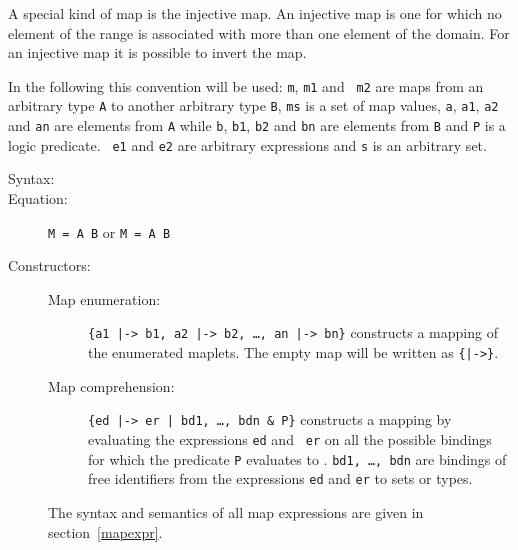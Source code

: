 \documentclass[\pformat,12pt]{article}
\begin{document}
A special kind of map is the injective map. An injective map is one
for which no element of the range is associated with more than one
element of the domain. For an injective map it is possible to invert
the map.

In the following this convention will be used: {\tt m}, {\tt m1} and {\tt
  m2} are maps from an arbitrary type {\tt A} to another arbitrary type
{\tt B}, {\tt ms} is a set of map values, {\tt a}, {\tt a1}, {\tt a2} and
{\tt an} are elements from {\tt A} while {\tt b}, {\tt b1}, {\tt b2} and
{\tt bn} are elements from {\tt B} and {\tt P} is a logic predicate. {\tt
  e1} and {\tt e2} are arbitrary expressions and {\tt s} is an arbitrary
set.

\begin{description}
\item[Syntax:] 
  
  
  

\item[Equation:] {\tt M =  A  B} or {\tt M =
     A  B}

\item[Constructors:] \mbox{}

  \begin{description}
  \item[Map enumeration:] {\tt \{a1 |-> b1, a2 |-> b2, \ldots, an |-> bn\}}
    con\-structs a mapping of the enumerated maplets. The empty map will be
    written as {\tt \{|->\}}.

  \item[Map comprehension:] {\tt \{ed |-> er | bd1, \ldots, bdn \& P\}}
    constructs a mapping by evaluating the expressions {\tt ed} and {\tt
      er} on all the possible bindings for which the predicate {\tt P}
    evaluates to . {\tt bd1, \ldots, bdn} are bindings of
    free identifiers from the expressions {\tt ed} and {\tt er} to sets or types.
  \end{description}
  The syntax and semantics of all map expressions are given in
  section~\ref{mapexpr}.%



\end{description}
\end{document}
